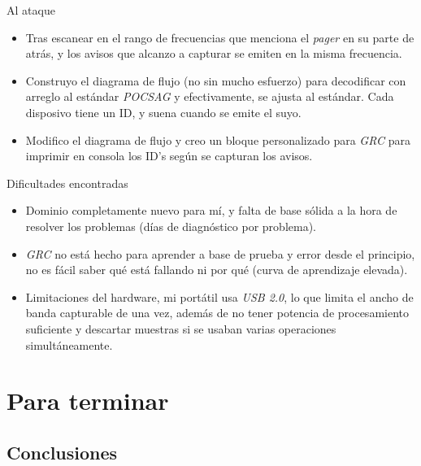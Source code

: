 \documentclass{beamer}
\begin{document}
\begin{frame}{Al ataque}

\begin{itemize}
	\item Tras escanear en el rango de frecuencias que menciona el \emph{pager} en su parte de atrás, y los avisos que alcanzo a capturar se emiten en la misma frecuencia.
	\item Construyo el diagrama de flujo (no sin mucho esfuerzo) para decodificar con arreglo al estándar \emph{POCSAG} y efectivamente, se ajusta al estándar. Cada disposivo tiene un ID, y suena cuando se emite el suyo.
	\item Modifico el diagrama de flujo y creo un bloque personalizado para \emph{GRC} para imprimir en consola los ID's según se capturan los avisos.
\end{itemize}

\end{frame}

\begin{frame}{Dificultades encontradas}

\begin{itemize}
	\item Dominio completamente nuevo para mí, y falta de base sólida a la hora de resolver los problemas (días de diagnóstico por problema).
	\item \emph{GRC} no está hecho para aprender a base de prueba y error desde el principio, no es fácil saber qué está fallando ni por qué (curva de aprendizaje elevada).
	\item Limitaciones del hardware, mi portátil usa \emph{USB 2.0}, lo que limita el ancho de banda capturable de una vez, además de no tener potencia de procesamiento suficiente y descartar muestras si se usaban varias operaciones simultáneamente.
\end{itemize}


\end{frame}

\section{Para terminar}

\subsection{Conclusiones}
\end{document}
